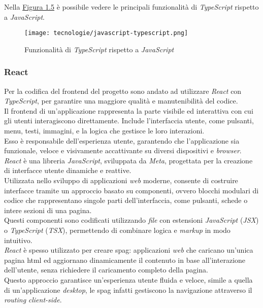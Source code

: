 \noindent Nella {\hyperref[fig:javacript-typescript]{Figura 1.5}} è possibile vedere le principali funzionalità di \textit{TypeScript} rispetto a \textit{JavaScript}.

\begin{figure}[H]
    \label{fig:javacript-typescript}
    \centering
    \texttt{[image: tecnologie/javascript-typescript.png]}
    \caption{Funzionalità di \textit{TypeScript} rispetto a \textit{JavaScript}}
    \cite{site:js-ts}
\end{figure}

\subsubsection{React}

\noindent Per la codifica del \gls{frontend} del progetto sono andato ad utilizzare \textit{React} con \textit{TypeScript}, per garantire una maggiore qualità e manutenibilità del codice.\\
Il \gls{frontend} di un’applicazione rappresenta la parte visibile ed interattiva con cui gli utenti interagiscono direttamente.
Include l’interfaccia utente, come pulsanti, menu, testi, immagini, e la logica che gestisce le loro interazioni.\\
Esso è responsabile dell’esperienza utente, garantendo che l’applicazione sia funzionale, veloce e visivamente accattivante su diversi dispositivi e \textit{browser}.\\

\noindent \textit{React} è una libreria \textit{JavaScript}, sviluppata da \textit{Meta}, progettata per la creazione di interfacce utente dinamiche e reattive. \\
Utilizzata nello sviluppo di applicazioni \textit{web} moderne, consente di costruire interfacce tramite un approccio basato su componenti,
ovvero blocchi modulari di codice che rappresentano singole parti dell’interfaccia, come pulsanti, schede o intere sezioni di una pagina.\\
Questi componenti sono codificati utilizzando \textit{file} con estensioni \textit{JavaScript} (\textit{JSX}) o \textit{TypeScript} (\textit{TSX}), permettendo di combinare logica e \textit{markup} in modo intuitivo.\\

\noindent \textit{React} è spesso utilizzato per creare \gls{spag}: applicazioni \textit{web} che caricano un'unica pagina \gls{html} ed aggiornano dinamicamente il contenuto in base all’interazione dell’utente, senza richiedere il caricamento completo della pagina.\\ 
Questo approccio garantisce un’esperienza utente fluida e veloce, simile a quella di un’applicazione \textit{desktop}, le \gls{spag} infatti gestiscono la navigazione attraverso il \textit{routing} \textit{client-side}.\\

